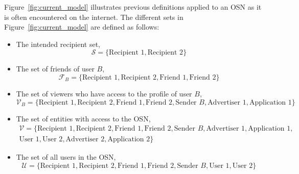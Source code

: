 Figure~\ref{fig:current_model} illustrates previous definitions applied to an OSN as it is often encountered on the internet. The different sets in Figure~\ref{fig:current_model} are defined as follows:
\begin{itemize}
 \item The intended recipient set,
 \begin{equation*}
  \mathcal{S} = \{ \textrm{Recipient 1}, \textrm{Recipient 2} \}
 \end{equation*}
 \item The set of friends of user $B$,
 \begin{equation*}
  \mathcal{F}_B = \{ \textrm{Recipient 1}, \textrm{Recipient 2}, \textrm{Friend 1}, \textrm{Friend 2} \}
 \end{equation*}
 \item The set of viewers who have access to the profile of user $B$,
 \begin{equation*}
  \mathcal{V}_B = \{ \textrm{Recipient 1}, \textrm{Recipient 2}, \textrm{Friend 1}, \textrm{Friend 2}, \textrm{Sender } B, \textrm{Advertiser 1}, \textrm{Application 1} \}
 \end{equation*}
 \item The set of entities with access to the OSN,
\begin{equation*}
\begin{split}
 \mathcal{V} = \{ \textrm{Recipient 1}, \textrm{Recipient 2}, \textrm{Friend 1}, \textrm{Friend 2}, \textrm{Sender } B, \textrm{Advertiser 1}, \textrm{Application 1}, \\
 \textrm{User 1}, \textrm{User 2}, \textrm{Advertiser 2}, \textrm{Application 2} \}
\end{split}
\end{equation*}
\item The set of all users in the OSN,
\begin{equation*}
 \mathcal{U} = \{ \textrm{Recipient 1}, \textrm{Recipient 2}, \textrm{Friend 1}, \textrm{Friend 2}, \textrm{Sender } B, \textrm{User 1}, \textrm{User 2}\}
\end{equation*}
\end{itemize}


